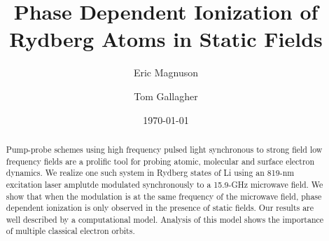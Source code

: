 \documentclass[aps,pra,preprint,groupedaddress]{revtex4-1}
\begin{document}
\title{Phase Dependent Ionization of Rydberg Atoms in Static Fields}


\author{Eric Magnuson}
\author{Tom Gallagher}


\date{\today}

\begin{abstract}
Pump-probe schemes using high frequency pulsed light synchronous to strong field low frequency fields are a prolific tool for probing atomic, molecular and surface electron dynamics. We realize one such system in Rydberg states of Li using an 819-nm excitation laser amplutde modulated synchronously to a 15.9-GHz microwave field. We show that when the modulation is at the same frequency of the microwave field, phase dependent ionization is only observed in the presence of static fields. Our results are well described by a computational model. Analysis of this model shows the importance of multiple classical electron orbits.
\end{abstract}

\pacs{}

\maketitle
\end{document}
